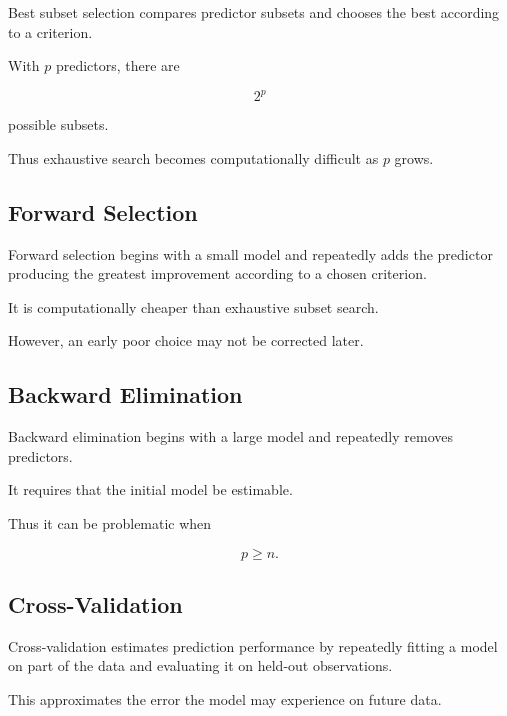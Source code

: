 Best subset selection compares predictor subsets and chooses the best
according to a criterion.

With \(p\) predictors, there are

\[
\boxed{
2^p
}
\]

possible subsets.

Thus exhaustive search becomes computationally difficult as \(p\)
grows.

\subsection{Forward Selection}
\label{subsec:forward-selection}

Forward selection begins with a small model and repeatedly adds the
predictor producing the greatest improvement according to a chosen
criterion.

It is computationally cheaper than exhaustive subset search.

However, an early poor choice may not be corrected later.

\subsection{Backward Elimination}
\label{subsec:backward-elimination}

Backward elimination begins with a large model and repeatedly removes
predictors.

It requires that the initial model be estimable.

Thus it can be problematic when

\[
p\geq n.
\]

\subsection{Cross-Validation}
\label{subsec:cross-validation}

Cross-validation estimates prediction performance by repeatedly fitting a
model on part of the data and evaluating it on held-out observations.

This approximates the error the model may experience on future data.


